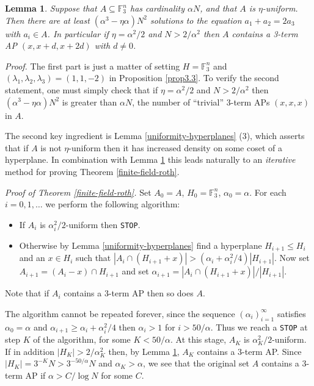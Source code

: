 \documentclass[12pt,a4paper,reqno]{amsart}
\numberwithin{equation}{section}
\theoremstyle{plain}
\newtheorem{lemma}[subsection]{Lemma}
\theoremstyle{definition}
\renewcommand{\leq}{\leqslant}
\renewcommand{\geq}{\geqslant}
\def\proof{\noindent\textit{Proof. }}
\def\endproof{\hfill{\usebox{\proofbox}}}
\begin{document}
\begin{lemma}\label{ap3-lemma}
Suppose that $A \subseteq \mathbb{F}_3^n$ has cardinality $\alpha N$, and that $A$ is $\eta$-uniform. Then there are at least $(\alpha^3 - \eta \alpha)N^2$ solutions to the equation $a_1 + a_2 = 2a_3$ with $a_i \in A$. In particular if $\eta = \alpha^2/2$ and $N > 2/\alpha^2$ then $A$ contains a 3-term AP $(x,x+d,x+2d)$ with $d \neq 0$.
\end{lemma}
\proof The first part is just a matter of setting $H = \mathbb{F}_3^n$ and $(\lambda_1,\lambda_2,\lambda_3) = (1,1,-2)$ in Proposition \ref{prop3.3}.
To verify the second statement, one must simply check that if $\eta  = \alpha^2 /2$ and $N > 2 /\alpha^2$ then $(\alpha^3 - \eta \alpha)N^2$ is greater than $\alpha N$, the number of ``trivial'' 3-term APs $(x,x,x)$ in $A$.\endproof\vspace{11pt}

\noindent The second key ingredient is Lemma \ref{uniformity-hyperplanes} (3), which asserts that if $A$ is not $\eta$-uniform then it has increased density on some coset of a hyperplane.
In combination with Lemma \ref{ap3-lemma} this leads naturally to an \textit{iterative} method for proving Theorem \ref{finite-field-roth}. \vspace{11pt}

\noindent\textit{Proof of Theorem \ref{finite-field-roth}.} Set $A_0 = A$, $H_0 = \mathbb{F}_3^n$, $\alpha_0 = \alpha$. For each $i = 0,1,\dots$ we perform the following algorithm:
\begin{itemize}
\item If $A_i$ is $\alpha_i^2/2$-uniform then \texttt{STOP}. 
\item Otherwise by Lemma \ref{uniformity-hyperplanes} find a hyperplane $H_{i+1} \leq H_i$ and an $x \in H_i$ such that $|A_i \cap (H_{i+1} + x)| > (\alpha_i + \alpha_i^2/4)|H_{i+1}|$. Now set $A_{i+1} = (A_i - x) \cap H_{i+1}$ and set $\alpha_{i+1} = |A_i \cap (H_{i+1} + x)|/|H_{i+1}|$.
\end{itemize}
Note that if $A_i$ contains a 3-term AP then so does $A$.\vspace{11pt}

\noindent The algorithm cannot be repeated forever, since the sequence $(\alpha_i)_{i=1}^{\infty}$ satisfies $\alpha_0 = \alpha$ and $\alpha_{i+1} \geq \alpha_i + \alpha_i^2/4$ then $\alpha_i > 1$ for $i > 50/\alpha$. Thus we reach a \texttt{STOP} at step $K$ of the algorithm, for some $K < 50/\alpha$. At this stage, $A_K$ is $\alpha_K^2/2$-uniform. If in addition $|H_K| > 2/\alpha_K^2$ then, by Lemma \ref{ap3-lemma}, $A_K$ contains a 3-term AP. Since $|H_K| = 3^{-K}N > 3^{-50/\alpha}N$ and $\alpha_K > \alpha$, we see that the original set $A$ contains a 3-term AP if $\alpha > C/\log N$ for some $C$.\endproof\vspace{11pt}
\end{document}
